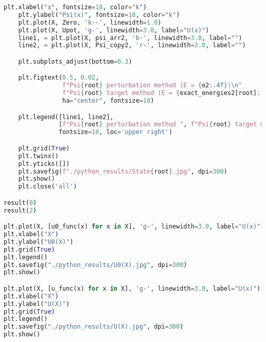 \begin{lstlisting}[language=Python, caption=Код файла solver.py,label={lst:solver}]
    plt.xlabel("x", fontsize=18, color="k")
    plt.ylabel("Psi(x)", fontsize=18, color="k")
    plt.plot(X, Zero, 'k--', linewidth=1.0)
    plt.plot(X, Upot, 'g-', linewidth=3.0, label="U(x)")
    line1, = plt.plot(X, psi_arr2, 'b-', linewidth=3.0, label="")
    line2, = plt.plot(X, Psi_copy2, 'r-', linewidth=3.0, label="")

    plt.subplots_adjust(bottom=0.3)

    plt.figtext(0.5, 0.02,
                f"Psi{root} perturbation method (E = {e2:.4f})\n"
                f"Psi{root} target method (E = {exact_energies2[root]:.4f})",
                ha="center", fontsize=10)

    plt.legend([line1, line2],
               [f"Psi{root} perturbation method ", f"Psi{root} target method"],
               fontsize=10, loc='upper right')

    plt.grid(True)
    plt.twinx()
    plt.yticks([])
    plt.savefig(f"./python_results/State{root}.jpg", dpi=300)
    plt.show()
    plt.close('all')

result(0)
result(2)

plt.plot(X, [u0_func(x) for x in X], 'g-', linewidth=3.0, label="U(x)")
plt.xlabel("X")
plt.ylabel("U0(X)")
plt.grid(True)
plt.legend()
plt.savefig("./python_results/U0(X).jpg", dpi=300)
plt.show()

plt.plot(X, [u_func(x) for x in X], 'g-', linewidth=3.0, label="U(x)")
plt.xlabel("X")
plt.ylabel("U(X)")
plt.grid(True)
plt.legend()
plt.savefig("./python_results/U(X).jpg", dpi=300)
plt.show()
\end{lstlisting}